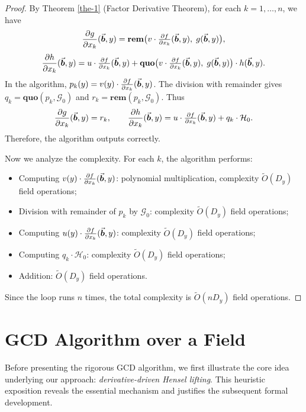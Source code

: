 \documentclass{article}
\numberwithin{equation}{section}
\begin{document}
\begin{proof}
By Theorem \ref{the-1} (Factor Derivative Theorem), for each $k = 1,\dots,n$, we have
\[
\frac{\partial g}{\partial x_k}(\vec{\boldsymbol{b}},y) = \mathbf{rem}\bigl(v \cdot \tfrac{\partial f}{\partial x_k}(\vec{\boldsymbol{b}},y),\; g(\vec{\boldsymbol{b}},y)\bigr),
\]
\[
\frac{\partial h}{\partial x_k}(\vec{\boldsymbol{b}},y) = u \cdot \tfrac{\partial f}{\partial x_k}(\vec{\boldsymbol{b}},y) + \mathbf{quo}\bigl(v \cdot \tfrac{\partial f}{\partial x_k}(\vec{\boldsymbol{b}},y),\; g(\vec{\boldsymbol{b}},y)\bigr) \cdot h(\vec{\boldsymbol{b}},y).
\]
In the algorithm, $p_k(y) = v(y) \cdot \frac{\partial f}{\partial x_k}(\vec{\boldsymbol{b}},y)$. The division with remainder gives $q_k = \mathbf{quo}(p_k, \mathcal{G}_0)$ and $r_k = \mathbf{rem}(p_k, \mathcal{G}_0)$. Thus
\[
\frac{\partial g}{\partial x_k}(\vec{\boldsymbol{b}},y) = r_k,\qquad 
\frac{\partial h}{\partial x_k}(\vec{\boldsymbol{b}},y) = u \cdot \tfrac{\partial f}{\partial x_k}(\vec{\boldsymbol{b}},y) + q_k \cdot \mathcal{H}_0.
\]
Therefore, the algorithm outputs correctly.

Now we analyze the complexity.
For each $k$, the algorithm performs:
\begin{itemize}
    \item Computing $v(y) \cdot \frac{\partial f}{\partial x_k}(\vec{\boldsymbol{b}},y)$: polynomial multiplication, complexity $\widetilde{O}(D_y)$ field operations;
    \item Division with remainder of $p_k$ by $\mathcal{G}_0$: complexity $\widetilde{O}(D_y)$ field operations;
    \item Computing $u(y) \cdot \frac{\partial f}{\partial x_k}(\vec{\boldsymbol{b}},y)$: complexity $\widetilde{O}(D_y)$ field operations;
    \item Computing $q_k \cdot \mathcal{H}_0$: complexity $\widetilde{O}(D_y)$ field operations;
    \item Addition: $\widetilde{O}(D_y)$ field operations.
\end{itemize}
Since the loop runs $n$ times, the total complexity is $\widetilde{O}(nD_y)$ field operations.
\end{proof}






\section{GCD Algorithm over a Field}
\label{sec:field-gcd}


Before presenting the rigorous GCD algorithm, we first illustrate the core idea underlying our approach: \emph{derivative-driven Hensel lifting}. This heuristic exposition reveals the essential mechanism and justifies the subsequent formal development.
\end{document}

